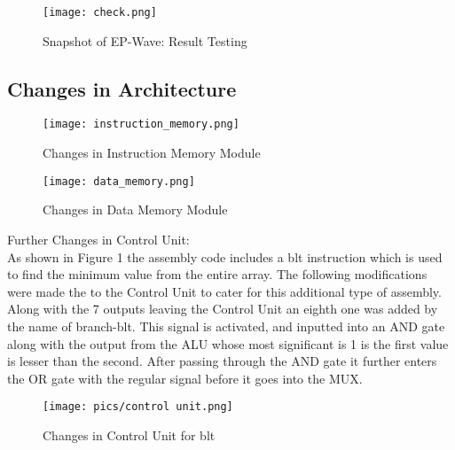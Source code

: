\documentclass{article}
\begin{document}
\begin{center}
    \begin{figure}[!htb]
        \centering
        \texttt{[image: check.png]}
        \caption{Snapshot of EP-Wave: Result Testing}
        \label{Snapshot of Memory}
    \end{figure}
\end{center}

\newpage

\subsection{Changes in Architecture}

\begin{center}
    \begin{figure}[!htb]
        \centering
        \texttt{[image: instruction\_memory.png]}
        \caption{Changes in Instruction Memory Module}
        \label{Snapshot of Memory}
    \end{figure}
\end{center}

\begin{center}
    \begin{figure}[!htb]
        \centering
        \texttt{[image: data\_memory.png]}
        \caption{Changes in Data Memory Module}
        \label{Snapshot of Memory}
    \end{figure}
\end{center}

Further Changes in Control Unit: \\ As shown in Figure 1 the assembly code includes a blt instruction which is used to find the minimum value from the entire array. The following modifications were made the to the Control Unit to cater for this additional type of assembly. Along with the 7 outputs leaving the Control Unit an eighth one was added by the name of branch-blt. This signal is activated, and inputted into an AND gate along with the output from the ALU whose most significant is 1 is the first value is lesser than the second. After passing through the AND gate it further enters the OR gate with the regular signal before it goes into the MUX.

\begin{center}
    \begin{figure}[!htb]
        \centering
        \texttt{[image: pics/control unit.png]}
        \caption{Changes in Control Unit for  blt }
        \label{Snapshot of Memory}
    \end{figure}
\end{center}
\end{document}

